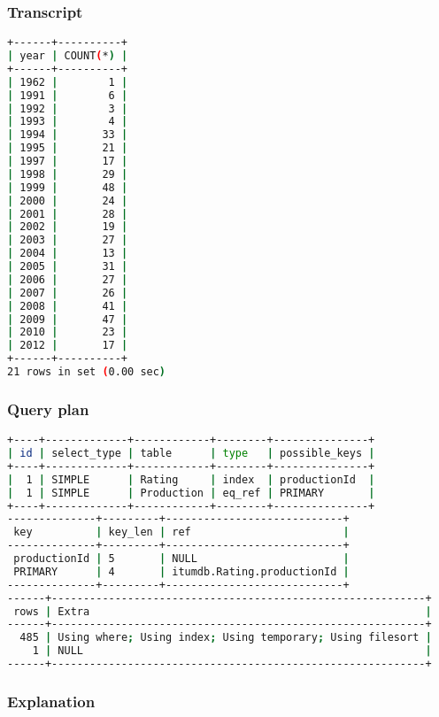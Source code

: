 \subsubsection{Transcript}
\begin{lstlisting}[language=bash]
+------+----------+
| year | COUNT(*) |
+------+----------+
| 1962 |        1 |
| 1991 |        6 |
| 1992 |        3 |
| 1993 |        4 |
| 1994 |       33 |
| 1995 |       21 |
| 1997 |       17 |
| 1998 |       29 |
| 1999 |       48 |
| 2000 |       24 |
| 2001 |       28 |
| 2002 |       19 |
| 2003 |       27 |
| 2004 |       13 |
| 2005 |       31 |
| 2006 |       27 |
| 2007 |       26 |
| 2008 |       41 |
| 2009 |       47 |
| 2010 |       23 |
| 2012 |       17 |
+------+----------+
21 rows in set (0.00 sec)
\end{lstlisting}

\subsubsection{Query plan}
\begin{lstlisting}[language=bash]
+----+-------------+------------+--------+---------------+
| id | select_type | table      | type   | possible_keys |
+----+-------------+------------+--------+---------------+
|  1 | SIMPLE      | Rating     | index  | productionId  |
|  1 | SIMPLE      | Production | eq_ref | PRIMARY       |
+----+-------------+------------+--------+---------------+
--------------+---------+----------------------------+
 key          | key_len | ref                        |
--------------+---------+----------------------------+
 productionId | 5       | NULL                       |
 PRIMARY      | 4       | itumdb.Rating.productionId |
--------------+---------+----------------------------+
------+-----------------------------------------------------------+
 rows | Extra                                                     |
------+-----------------------------------------------------------+
  485 | Using where; Using index; Using temporary; Using filesort |
    1 | NULL                                                      |
------+-----------------------------------------------------------+
\end{lstlisting}

\subsubsection{Explanation}


